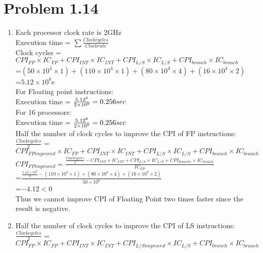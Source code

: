 \documentclass[]{article}
\begin{document}
\section*{Problem 1.14}
\begin{enumerate}[(1)]
\item Each processor clock rate is 2GHz
\\Execution time = $\sum\frac{Clock cycles}{Clock rate}$
\\Clock cycles = $CPI_{FP}\times IC_{FP} +CPI_{INT}\times IC_{INT}+CPI_{L/S}\times IC_{L/S}+CPI_{branch}\times IC_{branch}$
\\\hspace*{12.4ex} =$(50\times 10^4\times 1)+(110\times 10^4\times 1)+(80\times 10^4\times 4)+(16\times 10^4\times 2)$
\\\hspace*{12.4ex} =$5.12\times 10^8$e
\\For Floating point instructions:
\\\hspace*{5.5ex}Execution time = $\frac{5.12\time 10^8}{2\times 10^9} = 0.256 sec$
\\For 16 processors:
\\\hspace*{4.5ex} Execution time = $\frac{5.12\time 10^8}{2\times 10^9} = 0.256 sec$
\\Half the number of clock cycles to improve the CPI of FP instructions:
\\\hspace*{4.5ex} $\frac{Clockcycles}{2}$ = $CPI_{FPimproved}\times IC_{FP} +CPI_{INT}\times IC_{INT}+CPI_{L/S}\times IC_{L/S}+CPI_{branch}\times IC_{branch}$
$CPI_{FPimproved} =\frac{\frac{Clockcycles}{2}-CPI_{INT}\times IC_{INT}+CPI_{L/S}\times IC_{L/S}+CPI_{branche}\times IC_{branch}}{IC_{FP}}$
\\\hspace*{16.2ex}=$\frac{\frac{5.12\times 10^8}{2}-(110\times 10^4\times 1)+(80\times 10^4\times 4)+(16\times 10^4\times 2)}{50\times 10^6}$
\\\hspace*{16.2ex}=$-4.12<0$
\\Thus we cannot improve CPI of Floating Point two times faster since the result is negative.
\item Half the number of clock cycles to improve the CPI of LS instructions:
\\\hspace*{5ex} $\frac{Clockcycles}{2}$ = $CPI_{FP}\times IC_{FP} +CPI_{INT}\times IC_{INT}+CPI_{L/Simproved}\times IC_{L/S}+CPI_{branch}\times IC_{branch}$

\end{enumerate}
\end{document}
